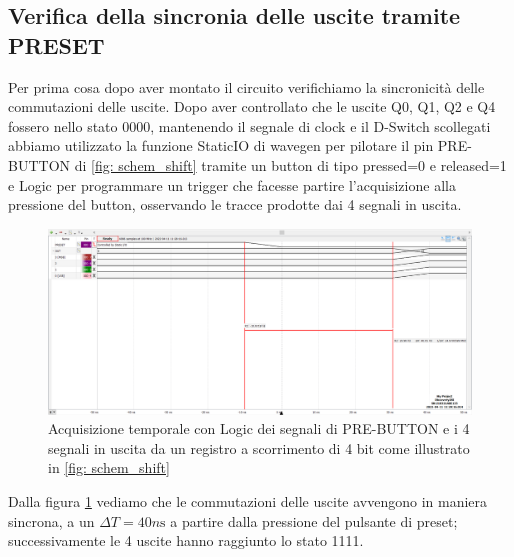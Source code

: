 \documentclass[10pt, a4paper, italian]{article}
\begin{document}
\subsection{Verifica della sincronia delle uscite tramite PRESET}
Per prima cosa dopo aver montato il circuito verifichiamo la sincronicità delle commutazioni delle uscite.
Dopo aver controllato che le uscite Q0, Q1, Q2 e Q4 fossero nello stato 0000, mantenendo il segnale di clock e il D-Switch scollegati abbiamo utilizzato la funzione StaticIO di wavegen per pilotare il pin PRE-BUTTON di \cref{fig: schem_shift} tramite un button di tipo pressed=0 e released=1 e  Logic per programmare un trigger che facesse partire l'acquisizione alla pressione del button, osservando le tracce prodotte dai 4 segnali in uscita.
\begin{figure}[htbp]
\centering
	\includegraphics[width=\textwidth]{3.trans}
	\caption{Acquisizione temporale con Logic dei segnali di PRE-BUTTON e i 4 segnali in uscita da un registro a scorrimento di 4 bit come illustrato in \cref{fig: schem_shift}
	\label{fig: Shift_reg_trans}}
\end{figure}
Dalla figura \cref{fig: Shift_reg_trans} vediamo che le commutazioni delle uscite avvengono in maniera sincrona, a un $\Delta T = 40 \si{n\s}$ a partire dalla pressione del pulsante di preset; successivamente le 4 uscite hanno raggiunto lo stato 1111.
\end{document}
